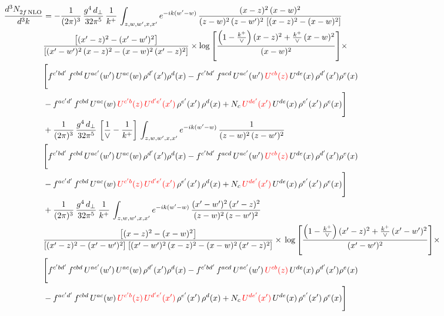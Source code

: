 \documentclass[9pt]{article}
\numberwithin{equation}{section}
\begin{document}
\begin{align}
    \frac{d^{3}N_{2f\,\rm NLO}^{\rm}}{d^{3}k}  & =   - \frac{1}{(2\pi)^{3}}\, \frac{g^{4}\,d_{\perp}}{32\pi^{5}}\,\frac{1}{k^{+}}\,\int_{z,w,w^{\prime},x,x'} e^{-ik(w^{\prime}-w)}\,\frac{(x-z)^{2}\, (x-w)^{2}}{(z-w)^{2}\, (z-w')^{2}\,\left[(x-z)^{2} - (x-w)^{2}\right]}\notag \\ & \frac{\left[(x'-z)^{2}-(x'-w')^{2}\right]}{\left[(x'-w')^{2}\, (x-z)^{2} - (x-w)^{2}\, (x'-z)^{2}\right]}\times \log{\left[\frac{\left(1-\frac{k^{+}}{\vee}\right)(x-z)^{2}+\frac{k^{+}}{\vee}\,(x-w)^{2}}{(x-w)^{2}}\right]}\times\notag \\ & \Bigg[f^{c'bd'}\,f^{cbd}\, U^{ac'}(w')\,U^{ac}(w)\,\rho^{d'}(x')\rho^{d}(x)- f^{c'bd'}\,f^{acd}\,U^{ac'}(w')\,{\color{red}U^{cb}(z)}\,U^{de}(x)\,\rho^{d'}(x')\rho^{e}(x) \notag \\ & -f^{ac'd'}\,f^{cbd}\,U^{ac}(w)\,{\color{red}U^{c'b}(z)\,U^{d'e'}(x')}\,\rho^{e'}(x')\,\rho^{d}(x) +N_{c}\,{\color{red}U^{de'}(x')}\,U^{de}(x)\,\rho^{e'}(x')\,\rho^{e}(x)\Bigg]  \notag \\
& + \frac{1}{(2\pi)^{3}}\, \frac{g^{4}\,d_{\perp}}{32\pi^{5}}\,\left[\frac{1}{\vee} - \frac{1}{k^{+}}\right]\,\int_{z,w,w^{\prime},x,x'} e^{-ik(w^{\prime}-w)}\,\frac{1}{(z-w)^{2}\, (z-w')^{2}}\notag \\ & \Bigg[f^{c'bd'}\,f^{cbd}\, U^{ac'}(w')\,U^{ac}(w)\,\rho^{d'}(x')\rho^{d}(x)- f^{c'bd'}\,f^{acd}\,U^{ac'}(w')\,{\color{red}U^{cb}(z)}\,U^{de}(x)\,\rho^{d'}(x')\rho^{e}(x) \notag \\ & -f^{ac'd'}\,f^{cbd}\,U^{ac}(w)\,{\color{red}U^{c'b}(z)\,U^{d'e'}(x')}\,\rho^{e'}(x')\,\rho^{d}(x) +N_{c}\,{\color{red}U^{de'}(x')}\,U^{de}(x)\,\rho^{e'}(x')\,\rho^{e}(x)\Bigg]  \notag \\
& + \frac{1}{(2\pi)^{3}}\, \frac{g^{4}\,d_{\perp}}{32\pi^{5}}\,\frac{1}{k^{+}}\,\int_{z,w,w^{\prime},x,x'} e^{-ik(w^{\prime}-w)}\,\frac{(x'-w')^{2}\, (x'-z)^{2}}{(z-w)^{2}\, (z-w')^{2}}\notag \\ & \frac{\left[(x-z)^{2} - (x-w)^{2}\right]}{\left[(x'-z)^{2} - (x'-w')^{2}\right]\, \left[(x'-w')^{2}\, (x - z)^{2} - (x-w)^{2}\,(x'-z)^{2}\right]}\times\, \log{\left[\frac{\left(1-\frac{k^{+}}{\vee}\right)(x'-z)^{2}+\frac{k^{+}}{\vee}\,(x'-w')^{2}}{(x'-w')^{2}}\right]}\times \notag \\ &  \Bigg[f^{c'bd'}\,f^{cbd}\, U^{ac'}(w')\,U^{ac}(w)\,\rho^{d'}(x')\rho^{d}(x)- f^{c'bd'}\,f^{acd}\,U^{ac'}(w')\,{\color{red}U^{cb}(z)}\,U^{de}(x)\,\rho^{d'}(x')\rho^{e}(x) \notag \\ & -f^{ac'd'}\,f^{cbd}\,U^{ac}(w)\,{\color{red}U^{c'b}(z)\,U^{d'e'}(x')}\,\rho^{e'}(x')\,\rho^{d}(x) +N_{c}\,{\color{red}U^{de'}(x')}\,U^{de}(x)\,\rho^{e'}(x')\,\rho^{e}(x)\Bigg]
\end{align}
\end{document}
